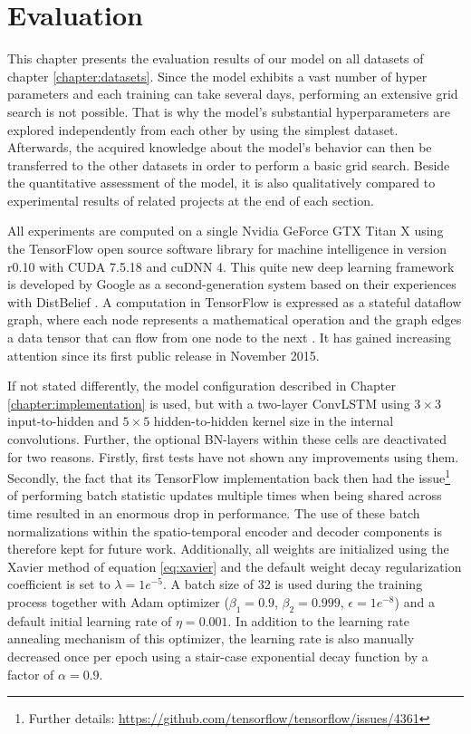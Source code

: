 
\chapter{Evaluation} \label{chapter:evaluation}

This chapter presents the evaluation results of our model on all datasets of chapter \ref{chapter:datasets}. Since the model exhibits a vast number of hyper parameters and each training can take several days, performing an extensive grid search is not possible. That is why the model's substantial hyperparameters are explored independently from each other by using the simplest dataset. Afterwards, the acquired knowledge about the model's behavior can then be transferred to the other datasets in order to perform a basic grid search. Beside the quantitative assessment of the model, it is also qualitatively compared to experimental results of related projects at the end of each section.

All experiments are computed on a single Nvidia GeForce GTX Titan X using the TensorFlow open source software library for machine intelligence in version r0.10 with CUDA 7.5.18 and cuDNN 4. This quite new deep learning framework is developed by Google as a second-generation system based on their experiences with DistBelief \parencite{distbelief}. A computation in TensorFlow is expressed as a stateful dataflow graph, where each node represents a mathematical operation and the graph edges a data tensor that can flow from one node to the next \parencite{tensorflow2015-whitepaper}. It has gained increasing attention since its first public release in November 2015.

If not stated differently, the model configuration described in Chapter \ref{chapter:implementation} is used, but with a two-layer ConvLSTM using $3\times3$ input-to-hidden and $5\times5$ hidden-to-hidden kernel size in the internal convolutions. Further, the optional BN-layers within these cells  are deactivated for two reasons. Firstly, first tests have not shown any improvements using them. Secondly, the fact that its TensorFlow implementation back then had the issue\footnote{Further details: \url{https://github.com/tensorflow/tensorflow/issues/4361}} of performing batch statistic updates multiple times when being shared across time resulted in an enormous drop in performance. The use of these batch normalizations within the spatio-temporal encoder and decoder components is therefore kept for future work. Additionally, all weights are initialized using the Xavier method of equation \ref{eq:xavier} and the default weight decay regularization coefficient is set to $\lambda=1e^{-5}$. A batch size of 32 is used during the training process together with Adam optimizer ($\beta_1 = 0.9$, $\beta_2 = 0.999$, $\epsilon =1e^{-8}$) and a default initial learning rate of $\eta = 0.001$. In addition to the learning rate annealing mechanism of this optimizer, the learning rate is also manually decreased once per epoch using a stair-case exponential decay function by a factor of $\alpha=0.9$.

